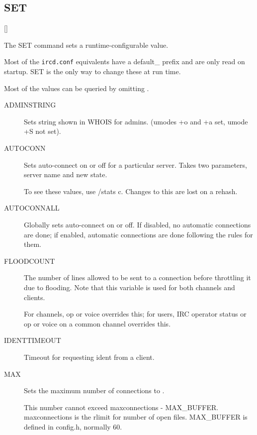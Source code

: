 \subsection{SET}

 [] 

The SET command sets a runtime-{}configurable value.

	Most of the \nolinkurl{ircd.conf} equivalents have a default\_ prefix
	and are only read on startup. SET is the only way to change these at
	run time.

	Most of the values can be queried by omitting .


\noindent
\begin{description}
\item[{ADMINSTRING}]
	Sets string shown in WHOIS for admins. (umodes +o and +a set, umode +S
	not set).

\item[{AUTOCONN}]
	Sets auto-{}connect on or off for a particular server. Takes two
	parameters, server name and new state.

	To see these values, use /stats c. Changes to this are lost on a
	rehash.

\item[{AUTOCONNALL}]
	Globally sets auto-{}connect on or off. If disabled, no automatic
	connections are done; if enabled, automatic connections are done
	following the rules for them.

\item[{FLOODCOUNT}]
	The number of lines allowed to be sent to a connection before
	throttling it due to flooding. Note that this variable is used for both
	channels and clients.

	For channels, op or voice overrides this; for users, IRC operator
	status or op or voice on a common channel overrides this.

\item[{IDENTTIMEOUT}]
	Timeout for requesting ident from a client.

\item[{MAX}]
	Sets the maximum number of connections to .

	This number cannot exceed maxconnections -{} MAX\_BUFFER.
	maxconnections is the rlimit for number of open files. MAX\_BUFFER is
	defined in config.h, normally 60.


\end{description}
